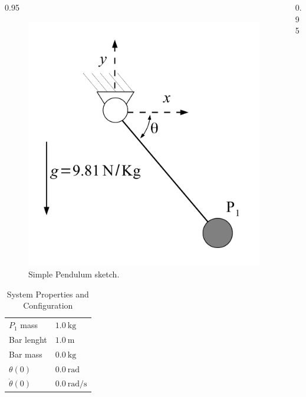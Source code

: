 \documentclass[final]{beamer}
\newlength{\onecolwid}
\newlength{\twocolwid}
\begin{document}
\begin{frame}[t]
\begin{columns}[t]
\begin{column}{\twocolwid}
\begin{columns}[t, totalwidth=\twocolwid]
\begin{column}{0.95\onecolwid}
\begin{figure}
\includegraphics[width=0.8\linewidth]{1MBS_Pendolum}
\caption{Simple Pendulum sketch.}
\label{FIG:SimplePendulum}
\end{figure}

\begin{table}
\begin{large}
\vspace{2ex}
\qquad\qquad
\begin{tabular}[b]{ll}
\toprule
$P_1$ mass & $\SI{1.0}{\kilogram}$\\
Bar lenght & $\SI{1.0}{\meter}$\\
Bar mass & $\SI{0.0}{\kilogram}$\\
$\theta(0)$ & $\SI{0.0}{\radian}$\\
$\dot{\theta}(0)$ & $\SI{0.0}{\radian / \second}$\\
\bottomrule
\end{tabular}
\end{large}
\label{TAB:SystemProperties}
\caption{System Properties and Configuration}
\end{table}


\end{column}

\begin{column}{0.95\onecolwid} %





\end{column}
\end{columns}
\end{column}
\end{columns}
\end{frame}
\end{document}
